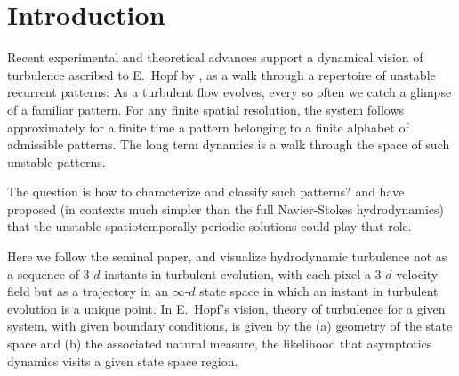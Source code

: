 %

\section{Introduction}


Recent experimental and theoretical advances  
support a dynamical vision
of turbulence ascribed to E.~Hopf by  \cite{EAS87}, as a walk through
a repertoire of unstable recurrent patterns:
As a turbulent flow evolves,
every so often we catch a glimpse of a familiar pattern.
For any finite  spatial resolution,
the system follows approximately for a finite time 
a pattern belonging to a 
{ finite alphabet}
of admissible patterns.
The long term dynamics is
a {  walk through the space of such unstable patterns}.

The question is how to characterize and classify such patterns?
\cite{MS66} and \cite{Christiansen:97} have proposed (in contexts
much simpler than the full Navier-Stokes hydrodynamics) 
that the unstable spatiotemporally periodic
solutions could play that role.

Here we follow the seminal
\cite{hopf48} paper, and  visualize
hydrodynamic turbulence not as  a sequence of 
3-$d$  instants in turbulent evolution, with
each pixel a 3-$d$ velocity field
but as a trajectory in an 
 $\infty$-$d$ state space in which an
instant in turbulent evolution is
a { unique} point. In E.~Hopf's vision, 
theory of turbulence for a given system, with given boundary conditions,
is given by the
(a) geometry of the state space and (b) the associated natural measure, 
\ie the likelihood that asymptotics dynamics visits a given state space region.

